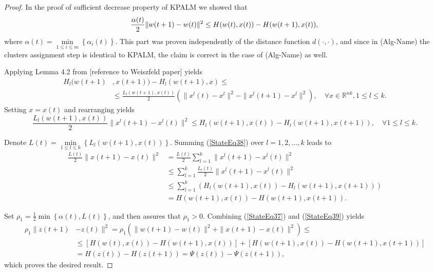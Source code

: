 \documentclass[11pt]{article}
\numberwithin{equation}{section}
\begin{document}
\begin{proof}
In the proof of sufficient decrease property of KPALM we showed that
\begin{equation}
	\frac{\alpha(t)}{2} \|w(t+1) - w(t)\|^2 \leq H(w(t),x(t)) - H(w(t+1),x(t)) , \\ \label{StateEq37}
\end{equation}
where $\alpha(t) = \min\limits_{1 \leq i \leq m} \left\lbrace \alpha_i(t) \right\rbrace$. This part was proven independently of the distance function $d(\cdot, \cdot)$, and since in (Alg-Name) the clusters assignment step is identical to KPALM, the claim is correct in the case of (Alg-Name) as well.

Applying Lemma 4.2 from [reference to Weiszfeld paper] yields
\begin{equation*}
	\begin{split}
	H_l(w(t+1)&,x(t+1)) - H_l(w(t+1),x) \leq \\ 
	& \leq \frac{L_l(w(t+1),x(t))}{2} \left( \|x^l(t) - x^l\|^2 - \|x^l(t+1) - x^l\|^2 \right), \quad \forall x \in \mathbb{R}^{nk}, 1 \leq l \leq k .
	\end{split}
\end{equation*}
Setting $x = x(t)$ and rearranging yields
\begin{equation}
	\frac{L_l(w(t+1),x(t))}{2} \|x^l(t+1) - x^l(t)\|^2 \leq H_l(w(t+1),x(t)) - H_l(w(t+1),x(t+1)), \quad \forall 1 \leq l \leq k . \label{StateEq38}
\end{equation}

Denote ${L(t)}= \min\limits_{1 \leq l \leq k} \left\lbrace L_l(w(t+1),x(t)) \right\rbrace$. Summing (\ref{StateEq38}) over $l = 1,2, \ldots ,k$ leads to
\begin{equation}
	\begin{split}
	\frac{L(t)}{2} \|x(t+1) - x(t)\|^2 &= 
	\frac{L(t)}{2} \sum\limits_{l=1}^{k} \|x^l(t+1) - x^l(t)\|^2 \\
	& \leq \sum\limits_{l=1}^{k} \frac{L_l(t)}{2} \|x^l(t+1) - x^l(t)\|^2 \\
	& \leq \sum\limits_{l=1}^{k} \left( H_l(w(t+1),x(t)) - H_l(w(t+1),x(t+1)) \right) \\
	& = H(w(t+1),x(t)) - H(w(t+1),x(t+1)) .
	\end{split} \label{StateEq39}
\end{equation}

Set $\rho_1 = \frac{1}{2} \min \left\lbrace \alpha(t), L(t) \right\rbrace$, and then  assures that $\rho_1 > 0$. Combining (\ref{StateEq37}) and (\ref{StateEq39}) yields
\begin{equation*}
\begin{aligned}
	\rho_1 \|z(t+1) &- z(t)\|^2 
	 = \rho_1 \left( \|w(t+1) - w(t)\|^2 + \|x(t+1) - x(t)\|^2  \right) \leq \\
	& \leq \left[ H(w(t),x(t)) - H(w(t+1),x(t)) \right] + \left[ H(w(t+1),x(t)) - H(w(t+1),x(t+1)) \right] \\
	& = H(z(t)) - H(z(t+1)) = \Psi(z(t)) - \Psi(z(t+1)),
\end{aligned}
\end{equation*}
which proves the desired result.
\end{proof}
\end{document}

